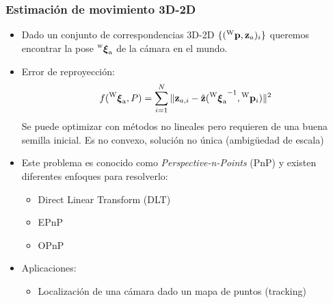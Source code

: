\begin{frame}
	\frametitle{Estimación de movimiento 3D-2D}
	\footnotesize
	
	\begin{itemize}
		\item Dado un conjunto de correspondencias 3D-2D $\{(\prescript{\mathrm{\mathrm{W}}}{}{\boldsymbol{\mathbf{p}}}, \boldsymbol{\mathbf{z}}_{a})_{i}\}$ queremos encontrar la pose $\prescript{\mathrm{w}}{}{{\boldsymbol{\mathbf{\xi}}}_\mathrm{a}}$ de la cámara en el mundo.
		\item Error de reproyección:
		\[
		f(\prescript{\mathrm{\mathrm{W}}}{}{{\boldsymbol{\mathbf{\xi}}}_\mathrm{a}}, P)= \sum_{i=1}^{N} \Vert \boldsymbol{\mathbf{z}}_{a,i} - \hat{\boldsymbol{\mathbf{z}}}({\prescript{\mathrm{\mathrm{W}}}{}{{\boldsymbol{\mathbf{\xi}}}_\mathrm{a}}}^{-1},\prescript{\mathrm{\mathrm{W}}}{}{\boldsymbol{\mathbf{p}}}_{i}) \Vert^{2}
		\]
		Se puede optimizar con métodos no lineales pero requieren de una buena semilla inicial. Es no convexo, solución no única (ambigüedad de escala)
		\item Este problema es conocido como \emph{Perspective-n-Points} (PnP) y existen diferentes enfoques para resolverlo:
		\begin{itemize}
			\item Direct Linear Transform (DLT)
			\item EPnP
			\item OPnP
		\end{itemize}
		\item Aplicaciones:
		\begin{itemize}
			\item Localización de una cámara dado un mapa de puntos (tracking)
		\end{itemize}
	\end{itemize}
	
\end{frame}

